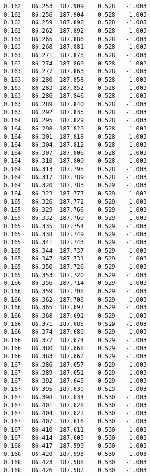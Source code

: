 \begin{verbatim}
   0.162   86.253  187.909    0.528   -1.003
   0.162   86.256  187.904    0.528   -1.003
   0.162   86.259  187.898    0.528   -1.003
   0.162   86.262  187.892    0.528   -1.003
   0.163   86.265  187.886    0.528   -1.003
   0.163   86.268  187.881    0.528   -1.003
   0.163   86.271  187.875    0.528   -1.003
   0.163   86.274  187.869    0.528   -1.003
   0.163   86.277  187.863    0.528   -1.003
   0.163   86.280  187.858    0.528   -1.003
   0.163   86.283  187.852    0.528   -1.003
   0.163   86.286  187.846    0.528   -1.003
   0.163   86.289  187.840    0.528   -1.003
   0.163   86.292  187.835    0.528   -1.003
   0.164   86.295  187.829    0.528   -1.003
   0.164   86.298  187.823    0.528   -1.003
   0.164   86.301  187.818    0.528   -1.003
   0.164   86.304  187.812    0.528   -1.003
   0.164   86.307  187.806    0.528   -1.003
   0.164   86.310  187.800    0.528   -1.003
   0.164   86.313  187.795    0.528   -1.003
   0.164   86.317  187.789    0.528   -1.003
   0.164   86.320  187.783    0.529   -1.003
   0.164   86.323  187.777    0.529   -1.003
   0.165   86.326  187.772    0.529   -1.003
   0.165   86.329  187.766    0.529   -1.003
   0.165   86.332  187.760    0.529   -1.003
   0.165   86.335  187.754    0.529   -1.003
   0.165   86.338  187.749    0.529   -1.003
   0.165   86.341  187.743    0.529   -1.003
   0.165   86.344  187.737    0.529   -1.003
   0.165   86.347  187.731    0.529   -1.003
   0.165   86.350  187.726    0.529   -1.003
   0.165   86.353  187.720    0.529   -1.003
   0.166   86.356  187.714    0.529   -1.003
   0.166   86.359  187.708    0.529   -1.003
   0.166   86.362  187.703    0.529   -1.003
   0.166   86.365  187.697    0.529   -1.003
   0.166   86.368  187.691    0.529   -1.003
   0.166   86.371  187.685    0.529   -1.003
   0.166   86.374  187.680    0.529   -1.003
   0.166   86.377  187.674    0.529   -1.003
   0.166   86.380  187.668    0.529   -1.003
   0.166   86.383  187.662    0.529   -1.003
   0.167   86.386  187.657    0.529   -1.003
   0.167   86.389  187.651    0.529   -1.003
   0.167   86.392  187.645    0.529   -1.003
   0.167   86.395  187.639    0.529   -1.003
   0.167   86.398  187.634    0.530   -1.003
   0.167   86.401  187.628    0.530   -1.003
   0.167   86.404  187.622    0.530   -1.003
   0.167   86.407  187.616    0.530   -1.003
   0.167   86.410  187.611    0.530   -1.003
   0.167   86.414  187.605    0.530   -1.003
   0.168   86.417  187.599    0.530   -1.003
   0.168   86.420  187.593    0.530   -1.003
   0.168   86.423  187.588    0.530   -1.003
   0.168   86.426  187.582    0.530   -1.003

\end{verbatim}
